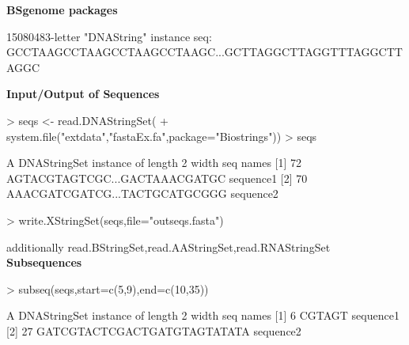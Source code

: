 \documentclass[pdf]{beamer}
\begin{document}
\begin{frame}[fragile]
\textbf{BSgenome packages}
\begin{block}{}
\begin{footnotesize}
\begin{Schunk}
\begin{Soutput}
  15080483-letter "DNAString" instance
seq: GCCTAAGCCTAAGCCTAAGCCTAAGC...GCTTAGGCTTAGGTTTAGGCTTAGGC
\end{Soutput}
\end{Schunk}
\end{footnotesize}
\end{block}
\end{frame}


\begin{frame}[fragile]
\textbf{Input/Output of Sequences}
\begin{block}{}
\begin{footnotesize}
\begin{Schunk}
\begin{Sinput}
> seqs <- read.DNAStringSet(
+   system.file("extdata","fastaEx.fa",package="Biostrings"))
> seqs
\end{Sinput}
\begin{Soutput}
  A DNAStringSet instance of length 2
    width seq                           names               
[1]    72 AGTACGTAGTCGC...GACTAAACGATGC sequence1
[2]    70 AAACGATCGATCG...TACTGCATGCGGG sequence2
\end{Soutput}
\begin{Sinput}
> write.XStringSet(seqs,file="outseqs.fasta")
\end{Sinput}
\end{Schunk}
additionally read.BStringSet,read.AAStringSet,read.RNAStringSet\\
\textbf{Subsequences}
\begin{Schunk}
\begin{Sinput}
> subseq(seqs,start=c(5,9),end=c(10,35))
\end{Sinput}
\begin{Soutput}
  A DNAStringSet instance of length 2
    width seq                           names               
[1]     6 CGTAGT                        sequence1
[2]    27 GATCGTACTCGACTGATGTAGTATATA   sequence2
\end{Soutput}
\end{Schunk}
\end{footnotesize}
\end{block}
\end{frame}
\end{document}
